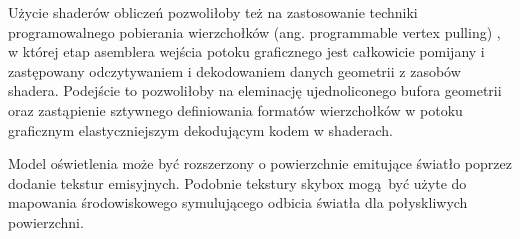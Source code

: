 Użycie shaderów obliczeń pozwoliłoby też na zastosowanie techniki programowalnego pobierania wierzchołków (ang. programmable vertex pulling) \cite{kosarevsky20213d}, w której etap asemblera wejścia potoku graficznego jest całkowicie pomijany i zastępowany odczytywaniem i dekodowaniem danych geometrii z zasobów shadera.
Podejście to pozwoliłoby na eleminację ujednoliconego bufora geometrii oraz zastąpienie sztywnego definiowania formatów wierzchołków w potoku graficznym elastyczniejszym dekodującym kodem w shaderach. 

Model oświetlenia może być rozszerzony o powierzchnie emitujące światło poprzez dodanie tekstur emisyjnych.
Podobnie tekstury skybox mogą być użyte do mapowania środowiskowego symulującego odbicia światła dla połyskliwych powierzchni.

